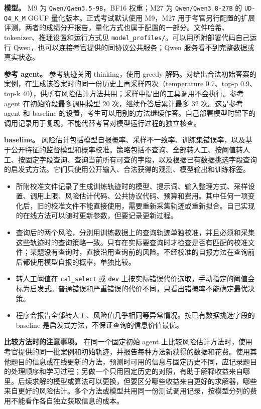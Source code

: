 \documentclass[11pt,a4paper]{article}
\providecommand{\tightlist}{\setlength{\itemsep}{3pt}\setlength{\parskip}{0pt}}
\begin{document}
\textbf{模型。} M9 为 \texttt{Qwen/Qwen3.5-9B}，BF16 权重；M27 为
\texttt{Qwen/Qwen3.8-27B} 的 \texttt{UD-Q4\_K\_M} GGUF
量化版本。正式考试默认使用 M9，M27
用于考官另行配置的扩展评测，两者的成绩分开报告，量化方式也属于配置的一部分。文件哈希、tokenizer、推理设置和运行方式见
\texttt{model\_profiles/}。可以用所附部署代码自己运行
Qwen，也可以连接考官提供的同协议公共服务；Qwen
服务看不到完整数据或真实状态。

\textbf{参考 agent。} 参考轨迹关闭 thinking，使用 greedy
解码。对给出合法初始答案的案例，在生成该答案时的同一份历史上再采样四次（temperature
0.7、top-p 0.9、top-k
40），供所有风险估计方法共用；采样中提出的工具调用不会执行。参考 agent
在初始阶段最多调用模型 20 次，继续作答后累计最多 32 次。这是参考 agent
和 baseline
的设置，考生可以用别的方法继续作答。自己部署模型时留下的调用记录用于复现，不能代替考官对模型运行过程的独立核查。

\textbf{baseline。}
风险估计包括模型自报概率、采样不一致率、训练集错误率，以及基于公开特征的监督模型和概率校准。策略包括不查询、全部转人工、按阈值转人工、按固定字段查询、查询当前所有可查的字段，以及根据已有数据挑选字段查询的启发式方法。它们只使用公开输入、合法获得的观测、模型输出和训练标签。

\begin{itemize}
\tightlist
\item
  所附校准文件记录了生成训练轨迹时的模型、提示词、输入整理方式、采样设置、调用上限、风险估计代码、公共协议代码、预算和费用。其中任何一项变化后，旧的校准文件不能直接使用，需要重新采集轨迹或重新拟合。自己实现的在线方法可以随时更新参数，但要记录更新过程。
\item
  查询后的两个风险，分别用训练数据上的查询轨迹单独校准，并且必须和采集这些轨迹时的查询策略一致。只有在实际要查询时才检查是否有匹配的校准文件；某题没有查询时，直接沿用查询前的风险。不经校准的自报方法在查询前后都使用模型自报的概率，单独比较。
\item
  转人工阈值在 \texttt{cal\_select} 或 \texttt{dev}
  上按实际错误代价选取，手动指定的阈值会标为启发式。普通错误和严重错误的代价不同，只看出错概率不能确定最优决策。
\item
  程序会报告全部转人工、风险值几乎相同等异常情况。按已有数据挑选字段的
  baseline 是启发式方法，不保证查询的信息价值最优。
\end{itemize}

\textbf{比较方法时的注意事项。} 在同一个固定初始 agent
上比较风险估计方法时，使用考官提供的同一批案例和初始轨迹，并报告每种方法新获得的数据和花费。使用其他题目的信息或在线更新的方法，预测时可用的信息与固定历史不同，应记录题目的处理顺序和学习过程；另做一个只用固定历史的对照，有助于解释收益来自哪里。后续求解的模型或算法可以更换，但要区分哪些收益来自更好的求解器，哪些来自更好的风险估计。多个方法或模型共用同一份测试调用记录，按模型分列的费用不能看作各自独立获取信息的成本。
\end{document}
